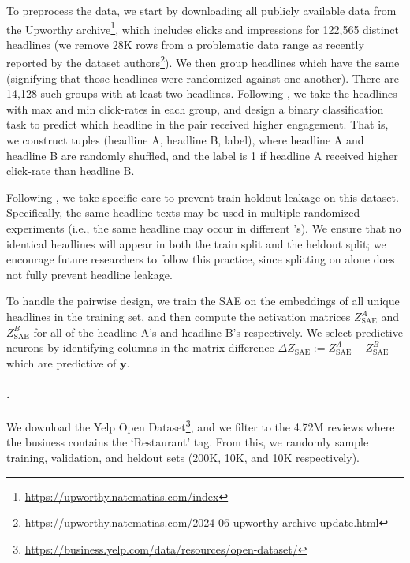 To preprocess the data, we start by downloading all publicly available data from the Upworthy archive\footnote{\href{https://upworthy.natematias.com/index}{https://upworthy.natematias.com/index}}, which includes clicks and impressions for 122,565 distinct headlines (we remove 28K rows from a problematic data range as recently reported by the dataset authors\footnote{\href{https://upworthy.natematias.com/2024-06-upworthy-archive-update.html}{https://upworthy.natematias.com/2024-06-upworthy-archive-update.html}}). 
We then group headlines which have the same  (signifying that those headlines were randomized against one another).
There are 14,128 such groups with at least two headlines.
Following \citet{zhou_hypothesis_2024}, we take the headlines with max and min click-rates in each group, and design a binary classification task to predict which headline in the pair received higher engagement.
That is, we construct tuples (headline A, headline B, label), where headline A and headline B are randomly shuffled, and the label is 1 if headline A received higher click-rate than headline B.

Following \citet{batista_words_2024}, we take specific care to prevent train-holdout leakage on this dataset. 
Specifically, the same headline texts may be used in multiple randomized experiments (i.e., the same headline may occur in different 's).
We ensure that no identical headlines will appear in both the train split and the heldout split; we encourage future researchers to follow this practice, since splitting on  alone does not fully prevent headline leakage.

To handle the pairwise design, we train the SAE on the embeddings of all unique headlines in the training set, and then compute the activation matrices $Z_{\text{SAE}}^A$ and $Z_{\text{SAE}}^B$ for all of the headline A's and headline B's respectively.
We select predictive neurons by identifying columns in the matrix difference $\Delta Z_{\text{SAE}} := Z_{\text{SAE}}^A - Z_{\text{SAE}}^B$ which are predictive of $\mathbf{y}$.

\paragraph{\yelp.} We download the Yelp Open Dataset\footnote{\href{https://business.yelp.com/data/resources/open-dataset/}{https://business.yelp.com/data/resources/open-dataset/}}, and we filter to the 4.72M reviews where the business contains the `Restaurant' tag.
From this, we randomly sample training, validation, and heldout sets (200K, 10K, and 10K respectively).

